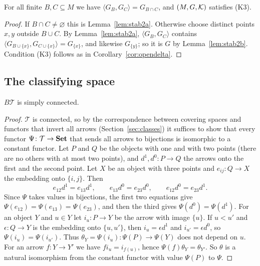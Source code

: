 \begin{proposition}\label{prop:open2}
For all finite $B,C\subseteq M$ we have $\langle G_B,G_C\rangle=G_{B\cap C}$, and
$(M,G,\mathcal{K})$ satisfies \textup{(K3)}.
\end{proposition}

\begin{proof}
If $B\cap C\ne\varnothing$ this is Lemma~\ref{lem:stab2a}. Otherwise choose
distinct points $x,y$ outside $B\cup C$. By Lemma~\ref{lem:stab2a},
$\langle G_B,G_C\rangle$ contains
$\langle G_{B\cup\{x\}},G_{C\cup\{x\}}\rangle=G_{\{x\}}$, and likewise
$G_{\{y\}}$; so it is $G$ by Lemma~\ref{lem:stab2b}. Condition (K3) follows as
in Corollary~\ref{cor:opendelta}.
\end{proof}

\subsection{The classifying space}

\begin{lemma}\label{lem:pi1}
$B\mathcal T$ is simply connected.
\end{lemma}

\begin{proof}
$\mathcal T$ is connected, so by the correspondence between covering spaces
and functors that invert all arrows (Section~\ref{sec:classes}) it
suffices to show that every functor $\Psi\colon\mathcal T\to\mathbf{Set}$ that sends
all arrows to bijections is isomorphic to a constant functor. Let $P$ and
$Q$ be the objects with one and with two points (there are no others with at
most two points), and $d^1,d^0\colon P\to Q$ the arrows onto the first and the
second point. Let $X$ be an object with three points and
$e_{ij}\colon Q\to X$ the embedding onto $\{i,j\}$. Then
\[
 e_{12}d^1=e_{13}d^1,\qquad e_{13}d^0=e_{23}d^0,\qquad e_{12}d^0=e_{23}d^1 .
\]
Since $\Psi$ takes values in bijections, the first two equations give
$\Psi(e_{12})=\Psi(e_{13})=\Psi(e_{23})$, and then the third gives
$\Psi(d^0)=\Psi(d^1)$. For an object $Y$ and $u\in Y$ let $i_u\colon P\to Y$ be
the arrow with image $\{u\}$. If $u<u'$ and $\epsilon\colon Q\to Y$ is the
embedding onto $\{u,u'\}$, then $i_u=\epsilon d^1$ and $i_{u'}=\epsilon d^0$, so
$\Psi(i_u)=\Psi(i_{u'})$. Thus $\theta_Y=\Psi(i_u)\colon\Psi(P)\to\Psi(Y)$ does
not depend on $u$. For an arrow $f\colon Y\to Y'$ we have $fi_u=i_{f(u)}$,
hence $\Psi(f)\theta_Y=\theta_{Y'}$. So $\theta$ is a natural isomorphism from
the constant functor with value $\Psi(P)$ to $\Psi$.
\end{proof}


